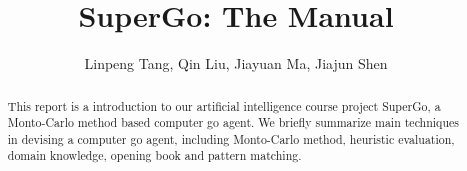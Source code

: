 \documentclass{article}
\theoremstyle{definition}
\theoremstyle{remark}
\numberwithin{equation}{section}
\begin{document}

\title{SuperGo: The Manual}
\author{Linpeng Tang, Qin Liu, Jiayuan Ma, Jiajun Shen}

\maketitle

\begin{abstract}
This report is a introduction to our artificial intelligence course project SuperGo, a Monto-Carlo method based computer go agent. We briefly summarize main techniques in devising a computer go agent, including Monto-Carlo method, heuristic evaluation, domain knowledge, opening book and pattern matching.
\end{abstract}



\end{document}
